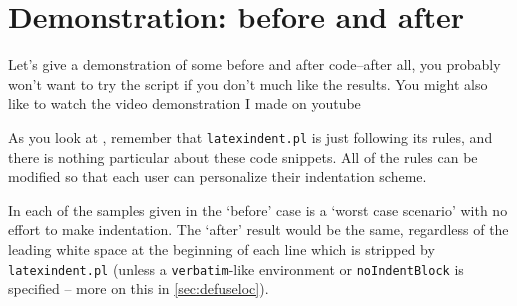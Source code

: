 \section{Demonstration: before and after}
 Let's give a demonstration of some before and after code--after all, you probably
 won't want to try the script if you don't much like the results. You might also
 like to watch the video demonstration I made on youtube \cite{cmh:videodemo}

 As you look at , remember
 that \texttt{latexindent.pl} is just following its rules, and there is nothing
 particular about these code snippets. All of the rules can be modified
 so that each user can personalize their indentation scheme.

 In each of the samples given in 
 the `before' case is a `worst case scenario' with no effort to make indentation. The `after'
 result would be the same, regardless of the leading white space at the beginning of
 each line which is stripped by \texttt{latexindent.pl} (unless a \texttt{verbatim}-like
 environment or \texttt{noIndentBlock} is specified -- more on this in \cref{sec:defuseloc}).

 \begin{sidebyside}
	 \centering
	 \begin{minipage}{.45\linewidth}
	 \end{minipage}\hfill
	 \begin{minipage}{.45\linewidth}
	 \end{minipage}%

	 \begin{minipage}{.45\linewidth}
	 \end{minipage}\hfill
	 \begin{minipage}{.45\linewidth}
	 \end{minipage}%

	 \begin{minipage}{.45\linewidth}
	 \end{minipage}\hfill
	 \begin{minipage}{.45\linewidth}
	 \end{minipage}%
 \end{sidebyside}

